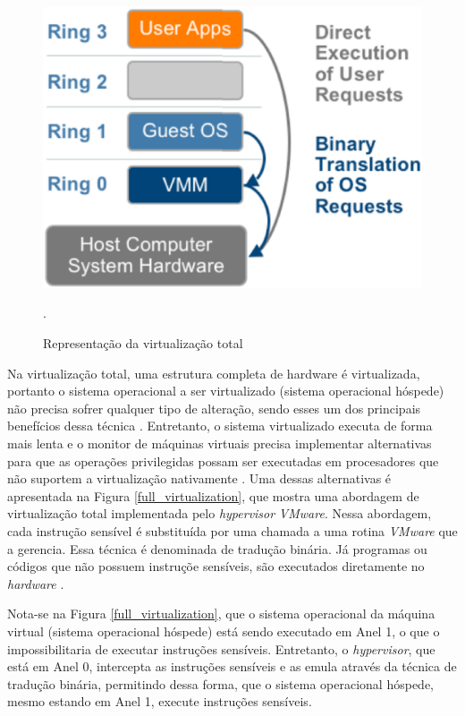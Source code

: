\begin{figure}[!htb]
\centering
\includegraphics [keepaspectratio=true,scale=0.3]{figuras/rings.eps}
\caption{Representação da virtualização total}
\cite{vmware}.
\label{rings}
\end{figure}


Na virtualização total, uma estrutura completa de hardware é virtualizada, portanto o sistema operacional a ser virtualizado (sistema operacional hóspede) não precisa sofrer qualquer tipo de alteração, sendo esses um dos principais benefícios dessa técnica \cite{marcos}. Entretanto, o sistema virtualizado executa de forma mais lenta e o monitor de máquinas virtuais precisa implementar alternativas para que as operações privilegidas possam ser executadas em procesadores que não suportem a virtualização nativamente \cite{marcos}. Uma dessas alternativas é apresentada na Figura \ref{full_virtualization}, que mostra uma abordagem de virtualização total implementada pelo \textit{hypervisor} \textit{VMware}. Nessa abordagem, cada instrução sensível é substituída por uma chamada a uma rotina \textit{VMware} que a gerencia. Essa técnica é denominada de tradução binária. Já programas ou códigos que não possuem instruçõe sensíveis, são executados diretamente no \textit{hardware} \cite{tanembaum}.

Nota-se na Figura \ref{full_virtualization}, que o sistema operacional da máquina virtual (sistema operacional hóspede) está sendo executado em Anel 1, o que o impossibilitaria de executar instruções sensíveis. Entretanto, o \textit{hypervisor}, que está em Anel 0, intercepta as instruções sensíveis e as emula através da técnica de tradução binária, permitindo dessa forma, que o sistema operacional hóspede, mesmo estando em Anel 1, execute instruções sensíveis.

